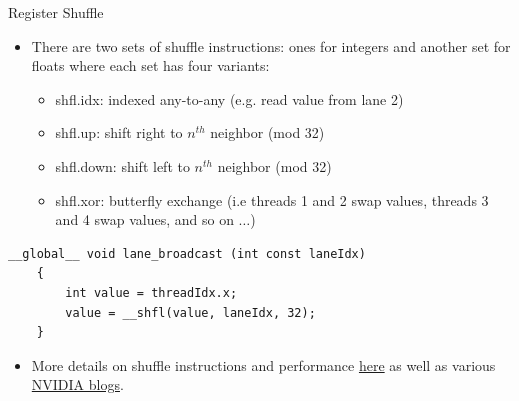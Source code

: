 \documentclass[handout]{beamer}
\begin{document}
\begin{frame}[fragile]{Register Shuffle}
\begin{itemize}
	\item<1->There are two sets of shuffle instructions: ones for integers and another set for floats where each set has four variants:
	\begin{itemize}
		\item<1->shfl.idx: indexed any-to-any (e.g. read value from lane 2)
		\item<1->shfl.up: shift right to $n^{th}$ neighbor (mod 32)
		\item<1->shfl.down: shift left to $n^{th}$ neighbor (mod 32)
		\item<1->shfl.xor: butterfly exchange (i.e threads 1 and 2 swap values, threads 3 and 4 swap values, and so on $\ldots$)
	\end{itemize}
\end{itemize}
\begin{lstlisting}[caption={Here all threads execute the shuffle instruction to read the register local variable {\fontfamily{qcr}\selectfont value} from lane specified by {\fontfamily{qcr}\selectfont laneIdx}. }]
    __global__ void lane_broadcast (int const laneIdx)
    {
        int value = threadIdx.x;
        value = __shfl(value, laneIdx, 32);
    }
\end{lstlisting}
\begin{itemize}
	\item<1->More details on shuffle instructions and performance \href{http://on-demand.gputechconf.com/gtc/2013/presentations/S3174-Kepler-Shuffle-Tips-Tricks.pdf}{\color{blue}here} as well as various \href{https://devblogs.nvidia.com/parallelforall/faster-parallel-reductions-kepler/}{\color{blue}NVIDIA blogs}.
\end{itemize}
\end{frame}

%

\end{document}
